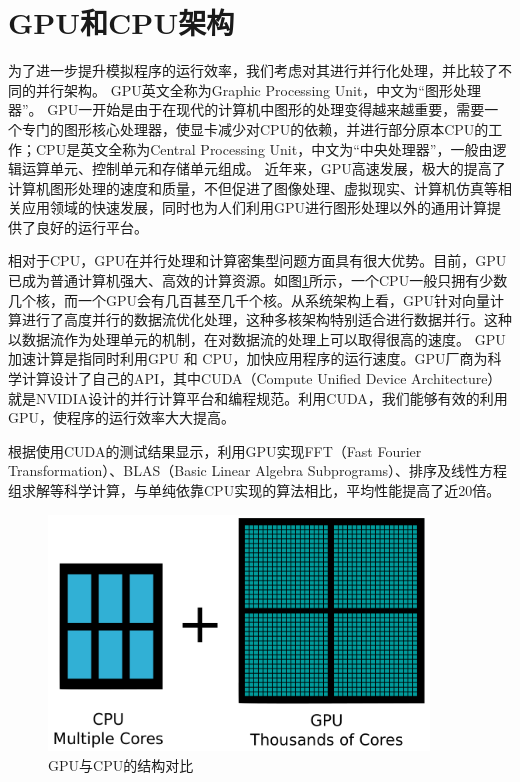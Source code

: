 \section{GPU和CPU架构}            \label{section:GPU_CPU}
为了进一步提升模拟程序的运行效率，我们考虑对其进行并行化处理，并比较了不同的并行架构。
GPU英文全称为Graphic Processing Unit，中文为“图形处理器”。
GPU一开始是由于在现代的计算机中图形的处理变得越来越重要，需要一个专门的图形核心处理器，使显卡减少对CPU的依赖，并进行部分原本CPU的工作；CPU是英文全称为Central Processing Unit，中文为“中央处理器”，一般由逻辑运算单元、控制单元和存储单元组成。
近年来，GPU高速发展，极大的提高了计算机图形处理的速度和质量，不但促进了图像处理、虚拟现实、计算机仿真等相关应用领域的快速发展，同时也为人们利用GPU进行图形处理以外的通用计算提供了良好的运行平台。

相对于CPU，GPU在并行处理和计算密集型问题方面具有很大优势。目前，GPU已成为普通计算机强大、高效的计算资源。如图\ref{fig:GPU}所示，一个CPU一般只拥有少数几个核，而一个GPU会有几百甚至几千个核。从系统架构上看，GPU针对向量计算进行了高度并行的数据流优化处理，这种多核架构特别适合进行数据并行。这种以数据流作为处理单元的机制，在对数据流的处理上可以取得很高的速度。
GPU 加速计算是指同时利用GPU 和 CPU，加快应用程序的运行速度\cite{gpu2008}。GPU厂商为科学计算设计了自己的API，其中CUDA（Compute Unified Device Architecture）就是NVIDIA设计的并行计算平台和编程规范\cite{nvidia2010programming}。利用CUDA，我们能够有效的利用GPU，使程序的运行效率大大提高。

根据使用CUDA的测试结果显示，利用GPU实现FFT（Fast Fourier Transformation）、BLAS（Basic Linear Algebra Subprograms）、排序及线性方程组求解等科学计算，与单纯依靠CPU实现的算法相比，平均性能提高了近20倍。
\begin{figure}[!htb]
    \centering
    \includegraphics[width=0.9\textwidth]{Img/GPU_vs_CPU.png}
    \caption{GPU与CPU的结构对比}
    \label{fig:GPU}
\end{figure}

